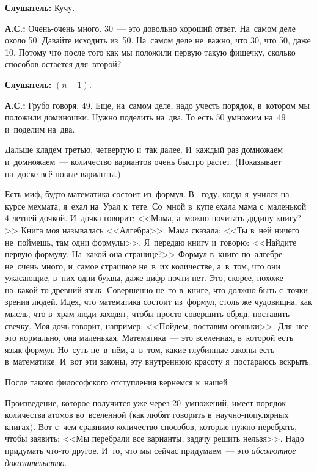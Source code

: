 \textbf{Слушатель:} Кучу.

\textbf{А.С.:} Очень-очень много. 30~--- это довольно хороший ответ. На~самом деле около 50.
Давайте исходить из~50. На~самом деле не~важно, что 30, что 50, даже 10. Потому что после того
как мы положили первую такую фишечку, сколько способов остается для~второй?

\textbf{Слушатель:} $(n-1)$.

\textbf{А.С.:} Грубо говоря, 49. Еще, на~самом деле, надо учесть порядок, в~котором мы положили
доминошки. Нужно поделить на~два. То есть 50 умножим на~49 и~поделим на~два.

Дальше кладем третью, четвертую и~так далее. И~каждый раз домножаем и~домножаем~--- количество
вариантов очень быстро растет.
 (Показывает на~доске всё новые варианты.)

{\it

Есть миф, будто математика состоит из~формул. В~ году, когда я~учился на~ курсе мехмата,
я~ехал на~Урал к~тете. Со~мной в~купе ехала мама с~маленькой 4-летней дочкой. И~дочка говорит:
<<Мама, а~можно почитать дядину книгу?>> Книга моя называлась <<Алгебра>>. Мама сказала: <<Ты в~ней
ничего не~поймешь, там одни формулы>>. Я~передаю книгу и~говорю: <<Найдите первую формулу. На~какой
она странице?>> Формул в~книге по~алгебре не~очень много, и~самое страшное не~в~их количестве,
а~в~том, что они ужасающие, в~них одни буквы, даже цифр почти нет. Это, скорее, похоже на~какой-то
древний язык. Совершенно не~то в~книге, что должно быть с~точки зрения людей. Идея, что математика
состоит из~формул, столь же чудовищна, как мысль, что в~храм люди заходят, чтобы просто совершить
обряд, поставить свечку. Моя дочь говорит, например: <<Пойдем, поставим огоньки>>. Для~нее это
нормально, она маленькая. Математика~--- это вселенная, в~которой есть язык формул. Но~суть
не~в~нём, а~в~том, какие глубинные законы есть в~математике. И~вот эти законы, эту внутреннюю
красоту я~постараюсь вскрыть.

}

После такого философского отступления вернемся к~нашей 

Произведение, которое получится уже через 20~умножений, имеет порядок количества атомов во~вселенной (как
любят говорить в~научно-популярных книгах). Вот с~чем сравнимо количество способов, которые нужно
перебрать, чтобы заявить: <<Мы перебрали все варианты, задачу решить нельзя>>.\vadjust{\pagebreak} Надо придумать что-то
другое. И~то, что мы сейчас придумаем~--- это \textit{абсолютное доказательство}.

